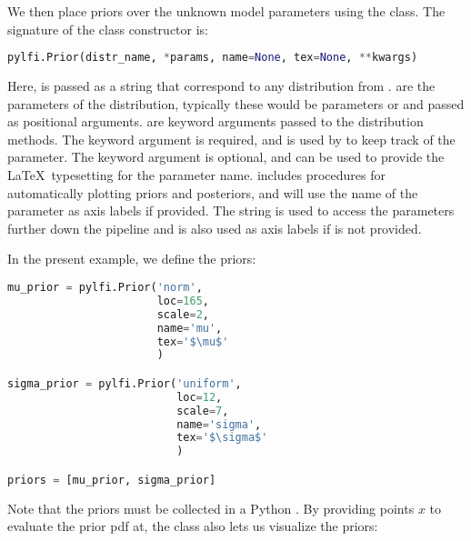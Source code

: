 We then place priors over the unknown model parameters using the  class. The signature of the class constructor is: 

\begin{lstlisting}[language=python]
pylfi.Prior(distr_name, *params, name=None, tex=None, **kwargs)
\end{lstlisting}

Here,  is passed as a string that correspond to any distribution from .  are the parameters of the distribution, typically these would be  parameters or  and  passed as positional arguments.  are keyword arguments passed to the  distribution methods. The  keyword argument is required, and is used by  to keep track of the parameter. The  keyword argument is optional, and can be used to provide the \LaTeX \, typesetting for the parameter name.  includes procedures for automatically plotting priors and posteriors, and will use the  name of the parameter as axis labels if provided. The  string is used to access the parameters further down the pipeline and is also used as axis labels if  is not provided. 

In the present example, we define the priors: 

\begin{lstlisting}[language=python]
mu_prior = pylfi.Prior('norm',
                       loc=165,
                       scale=2,
                       name='mu',
                       tex='$\mu$'
                       )

sigma_prior = pylfi.Prior('uniform',
                          loc=12,
                          scale=7,
                          name='sigma',
                          tex='$\sigma$'
                          )

priors = [mu_prior, sigma_prior]
\end{lstlisting}

Note that the priors must be collected in a Python . By providing points $x$ to evaluate the prior pdf at, the  class also lets us visualize the priors: 

